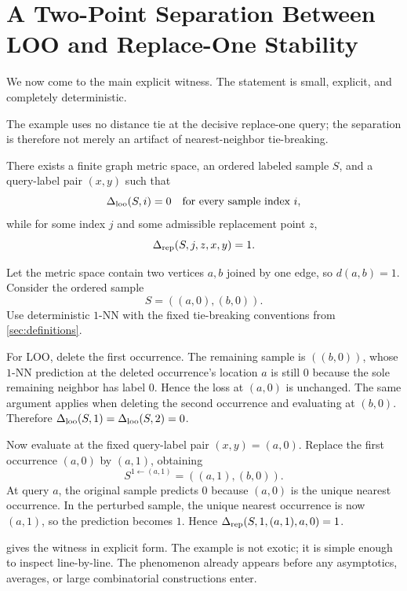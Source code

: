 \section[A Two-Point Separation Between LOO and Replace-One Stability]{A Two-Point Separation Between LOO and Replace-One Stability}
\label{sec:finite-separation}

We now come to the main explicit witness. The statement is
small, explicit, and completely deterministic.

\begin{note}
The example uses no distance tie at the decisive replace-one query; the
separation is therefore not merely an artifact of nearest-neighbor
tie-breaking.
\end{note}

\begin{proposition}
\label{prop:6.1}
There exists a finite graph metric space, an ordered labeled sample $S$, and a
query-label pair $(x,y)$ such that
\[
\Delta_{\mathrm{loo}}(S,i)=0 \quad\text{for every sample index } i,
\]
while for some index $j$ and some admissible replacement point $z$,
\[
\Delta_{\mathrm{rep}}(S,j,z,x,y)=1.
\]
\end{proposition}

\begin{note}
Let the metric space contain two vertices $a,b$ joined by one edge, so
$d(a,b)=1$. Consider the ordered sample
\[
S=((a,0),(b,0)).
\]
Use deterministic $1$-NN with the fixed tie-breaking conventions from
\cref{sec:definitions}.

For LOO, delete the first occurrence. The remaining sample is $((b,0))$, whose
$1$-NN prediction at the deleted occurrence's location $a$ is still $0$ because
the sole remaining neighbor has label $0$. Hence the loss at $(a,0)$ is
unchanged. The same argument applies when deleting the second occurrence and
evaluating at $(b,0)$. Therefore $\Delta_{\mathrm{loo}}(S,1)=\Delta_{\mathrm{loo}}(S,2)=0$.

Now evaluate at the fixed query-label pair $(x,y)=(a,0)$. Replace the first
occurrence $(a,0)$ by $(a,1)$, obtaining
\[
S^{1\leftarrow (a,1)}=((a,1),(b,0)).
\]
At query $a$, the original sample predicts $0$ because $(a,0)$ is the unique
nearest occurrence. In the perturbed sample, the unique nearest occurrence is
now $(a,1)$, so the prediction becomes $1$. Hence
$\Delta_{\mathrm{rep}}(S,1,(a,1),a,0)=1$.
\end{note}

 gives the witness in explicit form. The example is not exotic;
it is simple enough to inspect line-by-line. The phenomenon already appears
before any asymptotics, averages, or large combinatorial constructions enter.

